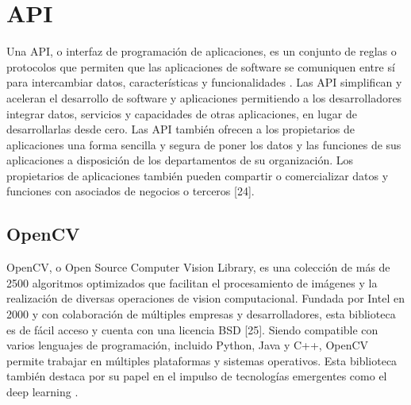 
\section{API}

\begin{list}{}%
    {\setlength{\leftmargin}{1cm}\setlength{\rightmargin}{1cm}}
    \item\relax
    \small

Una API, o interfaz de programación de aplicaciones, es un conjunto de reglas o protocolos que permiten que las aplicaciones de software se comuniquen entre sí para intercambiar datos, características y funcionalidades \cite{CitaD15}.
Las API simplifican y aceleran el desarrollo de software y aplicaciones permitiendo a los desarrolladores integrar datos, servicios y capacidades de otras aplicaciones, en lugar de desarrollarlas desde cero. Las API también ofrecen a los propietarios de aplicaciones una forma sencilla y segura de poner los datos y las funciones de sus aplicaciones a disposición de los departamentos de su organización. Los propietarios de aplicaciones también pueden compartir o comercializar datos y funciones con asociados de negocios o terceros [24].

\end{list}

\subsection{OpenCV}

\begin{list}{}%
    {\setlength{\leftmargin}{1cm}\setlength{\rightmargin}{1cm}}
    \item\relax
    \small

OpenCV, o Open Source Computer Vision Library, es una colección de más de 2500 algoritmos optimizados que facilitan el procesamiento de imágenes y la realización de diversas operaciones de vision computacional. Fundada por Intel en 2000 y con colaboración de múltiples empresas y desarrolladores, esta biblioteca es de fácil acceso y cuenta con una licencia BSD [25].
Siendo compatible con varios lenguajes de programación, incluido Python, Java y C++, OpenCV permite trabajar en múltiples plataformas y sistemas operativos. Esta biblioteca también destaca por su papel en el impulso de tecnologías emergentes como el deep learning \cite{CitaD16}.

\end{list}

